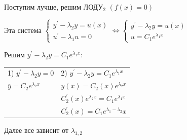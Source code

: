 \documentclass[12pt]{article}
\begin{document}
    Поступим лучше, решим ЛОДУ$_2$ $(f(x) = 0)$

    Эта система $\begin{cases}
                    y^\prime - \lambda_2 y = u(x) \\ u^\prime - \lambda_1 u = 0
    \end{cases}
    \Longleftrightarrow \begin{cases}
                            y^\prime - \lambda_2 y = u(x) \\ u = C_1 e^{\lambda_1 x}
    \end{cases}$

    Решим $y^\prime - \lambda_2 y = C_1 e^{\lambda_1 x}$:

    \begin{tabular}{p{5cm}p{10cm}}
        1) $y^\prime - \lambda_2 y = 0$      & 2) $y^\prime - \lambda_2 y = C_1 e^{\lambda_1 x}$     \\

        $\overline{y} = C_2 e^{\lambda_2 x}$ & $y(x) = C_2(x)e^{\lambda_2 x}$                        \\

        & $C_2^\prime(x) e^{\lambda_2 x} = C_1 e^{\lambda_1 x}$ \\

        & $C^\prime_2 (x) = C_1 e^{\lambda_1 - \lambda_2} x$
    \end{tabular}

    Далее все зависит от $\lambda_{1,2}$
\end{document}
